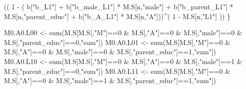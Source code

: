 \documentclass[
]{book}
\newenvironment{Shaded}{\begin{snugshade}}{\end{snugshade}}
\newcommand{\DecValTok}[1]{\textcolor[rgb]{0.00,0.00,0.81}{#1}}
\newcommand{\FunctionTok}[1]{\textcolor[rgb]{0.00,0.00,0.00}{#1}}
\newcommand{\NormalTok}[1]{#1}
\newcommand{\OtherTok}[1]{\textcolor[rgb]{0.56,0.35,0.01}{#1}}
\newcommand{\SpecialCharTok}[1]{\textcolor[rgb]{0.00,0.00,0.00}{#1}}
\newcommand{\StringTok}[1]{\textcolor[rgb]{0.31,0.60,0.02}{#1}}
\begin{document}
\begin{Shaded}
\begin{Highlighting}[]
\NormalTok{      (( }\DecValTok{1} \SpecialCharTok{{-}}\NormalTok{ ( b[}\StringTok{"b\_L1"}\NormalTok{] }\SpecialCharTok{+}
\NormalTok{                 b[}\StringTok{"b\_male\_L1"}\NormalTok{] }\SpecialCharTok{*}\NormalTok{ M.S[n,}\StringTok{"male"}\NormalTok{] }\SpecialCharTok{+}  
\NormalTok{                 b[}\StringTok{"b\_parent\_L1"}\NormalTok{] }\SpecialCharTok{*}\NormalTok{ M.S[n,}\StringTok{"parent\_educ"}\NormalTok{] }\SpecialCharTok{+}
\NormalTok{                 b[}\StringTok{"b\_A\_L1"}\NormalTok{] }\SpecialCharTok{*}\NormalTok{ M.S[n,}\StringTok{"A"}\NormalTok{]))}\SpecialCharTok{\^{}}\NormalTok{( }\DecValTok{1} \SpecialCharTok{{-}}\NormalTok{ M.S[n,}\StringTok{"L1"}\NormalTok{] )) }
\NormalTok{    \}}
  
\NormalTok{  M0.A0.L00 }\OtherTok{\textless{}{-}} \FunctionTok{sum}\NormalTok{(M.S[M.S[,}\StringTok{"M"}\NormalTok{]}\SpecialCharTok{==}\DecValTok{0} \SpecialCharTok{\&}\NormalTok{ M.S[,}\StringTok{"A"}\NormalTok{]}\SpecialCharTok{==}\DecValTok{0} \SpecialCharTok{\&}\NormalTok{ M.S[,}\StringTok{"male"}\NormalTok{]}\SpecialCharTok{==}\DecValTok{0} \SpecialCharTok{\&} 
\NormalTok{                         M.S[,}\StringTok{"parent\_educ"}\NormalTok{]}\SpecialCharTok{==}\DecValTok{0}\NormalTok{,}\StringTok{"sum"}\NormalTok{])}
\NormalTok{  M0.A0.L01 }\OtherTok{\textless{}{-}} \FunctionTok{sum}\NormalTok{(M.S[M.S[,}\StringTok{"M"}\NormalTok{]}\SpecialCharTok{==}\DecValTok{0} \SpecialCharTok{\&}\NormalTok{ M.S[,}\StringTok{"A"}\NormalTok{]}\SpecialCharTok{==}\DecValTok{0} \SpecialCharTok{\&}\NormalTok{ M.S[,}\StringTok{"male"}\NormalTok{]}\SpecialCharTok{==}\DecValTok{0} \SpecialCharTok{\&} 
\NormalTok{                         M.S[,}\StringTok{"parent\_educ"}\NormalTok{]}\SpecialCharTok{==}\DecValTok{1}\NormalTok{,}\StringTok{"sum"}\NormalTok{])}
\NormalTok{  M0.A0.L10 }\OtherTok{\textless{}{-}} \FunctionTok{sum}\NormalTok{(M.S[M.S[,}\StringTok{"M"}\NormalTok{]}\SpecialCharTok{==}\DecValTok{0} \SpecialCharTok{\&}\NormalTok{ M.S[,}\StringTok{"A"}\NormalTok{]}\SpecialCharTok{==}\DecValTok{0} \SpecialCharTok{\&}\NormalTok{ M.S[,}\StringTok{"male"}\NormalTok{]}\SpecialCharTok{==}\DecValTok{1} \SpecialCharTok{\&} 
\NormalTok{                         M.S[,}\StringTok{"parent\_educ"}\NormalTok{]}\SpecialCharTok{==}\DecValTok{0}\NormalTok{,}\StringTok{"sum"}\NormalTok{])}
\NormalTok{  M0.A0.L11 }\OtherTok{\textless{}{-}} \FunctionTok{sum}\NormalTok{(M.S[M.S[,}\StringTok{"M"}\NormalTok{]}\SpecialCharTok{==}\DecValTok{0} \SpecialCharTok{\&}\NormalTok{ M.S[,}\StringTok{"A"}\NormalTok{]}\SpecialCharTok{==}\DecValTok{0} \SpecialCharTok{\&}\NormalTok{ M.S[,}\StringTok{"male"}\NormalTok{]}\SpecialCharTok{==}\DecValTok{1} \SpecialCharTok{\&} 
\NormalTok{                         M.S[,}\StringTok{"parent\_educ"}\NormalTok{]}\SpecialCharTok{==}\DecValTok{1}\NormalTok{,}\StringTok{"sum"}\NormalTok{])}
  

\end{Highlighting}
\end{Shaded}
\end{document}
